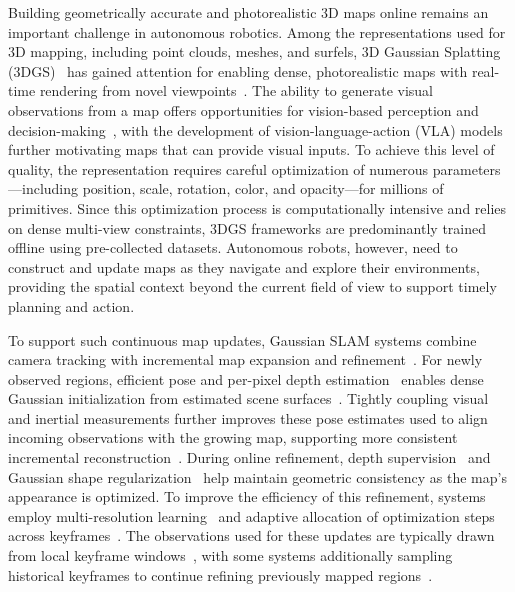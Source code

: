 
Building geometrically accurate and photorealistic 3D maps online remains an important challenge in autonomous robotics.
Among the representations used for 3D mapping, including point clouds, meshes, and surfels, 3D Gaussian Splatting (3DGS)~\cite{kerbl20233dgs} has gained attention for enabling dense, photorealistic maps with real-time rendering from novel viewpoints~\cite{matsuki2024monogs,huang2024photoslam}.
The ability to generate visual observations from a map offers opportunities for vision-based perception and decision-making~\cite{chen2025splat, intro_Shorinwa2025splatmover}, with the development of vision-language-action (VLA) models~\cite{zitkovich2023rt2, intro_black2024pi0} further motivating maps that can provide visual inputs.
To achieve this level of quality, the representation requires careful optimization of numerous parameters—including position, scale, rotation, color, and opacity—for millions of primitives.
Since this optimization process is computationally intensive and relies on dense multi-view constraints, 3DGS frameworks are predominantly trained offline using pre-collected datasets.
Autonomous robots, however, need to construct and update maps as they navigate and explore their environments, providing the spatial context beyond the current field of view to support timely planning and action.




To support such continuous map updates, Gaussian SLAM systems combine camera tracking with incremental map expansion and refinement~\cite{matsuki2024monogs,huang2024photoslam}.
For newly observed regions, efficient pose and per-pixel depth estimation~\cite{teed2021droid} enables dense Gaussian initialization from estimated scene surfaces~\cite{zhang2025hislam2}.
Tightly coupling visual and inertial measurements further improves these pose estimates used to align incoming observations with the growing map, supporting more consistent incremental reconstruction~\cite{vigsslam}.
During online refinement, depth supervision~\cite{zhang2025hislam2,vigsslam} and Gaussian shape regularization~\cite{matsuki2024monogs} help maintain geometric consistency as the map's appearance is optimized.
To improve the efficiency of this refinement, systems employ multi-resolution learning~\cite{huang2024photoslam} and adaptive allocation of optimization steps across keyframes~\cite{cartgs}.
The observations used for these updates are typically drawn from local keyframe windows~\cite{zhang2025hislam2}, with some systems additionally sampling historical keyframes to continue refining previously mapped regions~\cite{matsuki2024monogs,vigsslam}.




